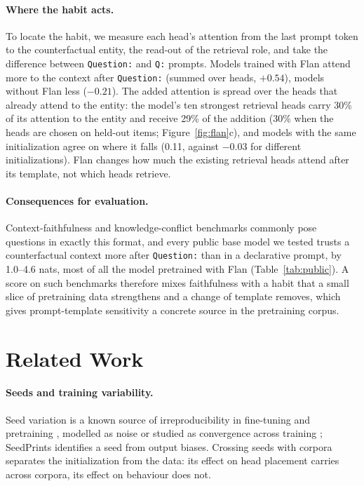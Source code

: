 \documentclass[11pt]{article}
\newcommand{\tmpl}[1]{\texttt{#1}}
\begin{document}
\paragraph{Where the habit acts.}
To locate the habit, we measure each head's attention from the last prompt token to the counterfactual entity, the read-out of the retrieval role, and take the difference between \tmpl{Question:} and \tmpl{Q:} prompts.
Models trained with Flan attend more to the context after \tmpl{Question:} (summed over heads, $+0.54$), models without Flan less ($-0.21$).
The added attention is spread over the heads that already attend to the entity: the model's ten strongest retrieval heads carry 30\% of its attention to the entity and receive 29\% of the addition (30\% when the heads are chosen on held-out items; Figure~\ref{fig:flan}c), and models with the same initialization agree on where it falls (0.11, against $-0.03$ for different initializations).
Flan changes how much the existing retrieval heads attend after its template, not which heads retrieve.

\paragraph{Consequences for evaluation.}
Context-faithfulness and knowledge-conflict benchmarks commonly pose questions in exactly this format, and every public base model we tested trusts a counterfactual context more after \tmpl{Question:} than in a declarative prompt, by 1.0--4.6 nats, most of all the model pretrained with Flan (Table~\ref{tab:public}).
A score on such benchmarks therefore mixes faithfulness with a habit that a small slice of pretraining data strengthens and a change of template removes, which gives prompt-template sensitivity \citep{sclar2024quantifying,hua2025flaw,liu2026prompt} a concrete source in the pretraining corpus.

\section{Related Work}
\label{sec:related}

\paragraph{Seeds and training variability.}
Seed variation is a known source of irreproducibility in fine-tuning and pretraining \citep{reimers2017reporting,dodge2020fine,mccoy2020berts,sellam2022multiberts}, modelled as noise \citep{benitosantos2025robust} or studied as convergence across training \citep{fehlauer2025convergence,vanderwal2025polypythias}; SeedPrints \citep{tong2026seedprints} identifies a seed from output biases.
Crossing seeds with corpora separates the initialization from the data: its effect on head placement carries across corpora, its effect on behaviour does not.
\end{document}
